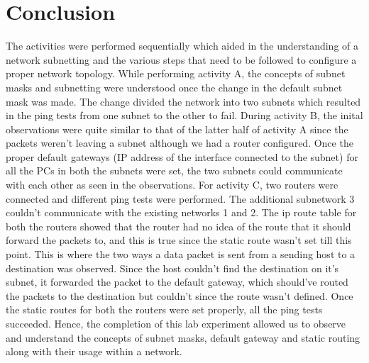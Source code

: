 \documentclass{lab_sheet}
\begin{document}
      \section{Conclusion}
       The activities were performed sequentially which aided in the understanding of a network subnetting and the various steps that need to be followed to configure a proper network topology. While performing activity A, the concepts of subnet masks and subnetting were understood once the change in the default subnet mask was made. The change divided the network into two subnets which resulted in the ping tests from one subnet to the other to fail. During activity B, the inital observations were quite similar to that of the latter half of activity A since the packets weren't leaving a subnet although we had a router configured. Once the proper default gateways (IP address of the interface connected to the subnet) for all the PCs in both the subnets were set, the two subnets could communicate with each other as seen in the observations. For activity C, two routers were connected and different ping tests were performed. The additional subnetwork 3 couldn't communicate with the existing networks 1 and 2. The ip route table for both the routers showed that the router had no idea of the route that it should forward the packets to, and this is true since the static route wasn't set till this point. This is where the two ways a data packet is sent from a sending host to a destination was observed. Since the host couldn't find the destination on it's subnet, it forwarded the packet to the default gateway, which should've routed the packets to the destination but couldn't since the route wasn't defined. Once the static routes for both the routers were set properly, all the ping tests succeeded. Hence, the completion of this lab experiment allowed us to observe and understand the concepts of subnet masks, default gateway and static routing along with their usage within a network.
\end{document}
